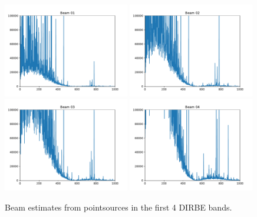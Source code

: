 \documentclass{aa}
\begin{document}
\begin{figure}
  \centering
  \includegraphics[width=0.49\textwidth]{figs/stacking/beam_01.pdf}
  \includegraphics[width=0.49\textwidth]{figs/stacking/beam_02.pdf}\\
  \includegraphics[width=0.49\textwidth]{figs/stacking/beam_03.pdf}
  \includegraphics[width=0.49\textwidth]{figs/stacking/beam_04.pdf}\\

  \caption{Beam estimates from pointsources in the first 4 DIRBE bands.}
  \label{fig:beams}
\end{figure}
\end{document}
